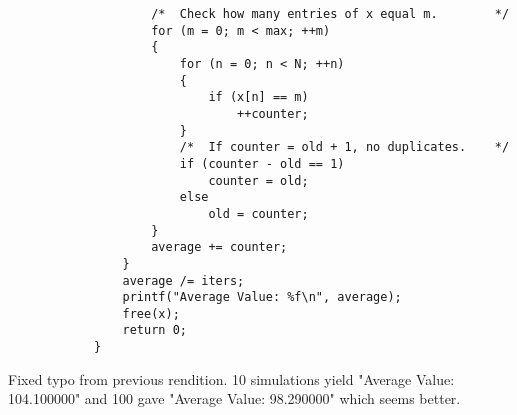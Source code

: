 \documentclass{article}
\begin{document}
\begin{lstlisting}
                    /*  Check how many entries of x equal m.        */
                    for (m = 0; m < max; ++m)
                    {
                        for (n = 0; n < N; ++n)
                        {
                            if (x[n] == m)
                                ++counter;
                        }
                        /*  If counter = old + 1, no duplicates.    */
                        if (counter - old == 1)
                            counter = old;
                        else
                            old = counter;
                    }
                    average += counter;
                }
                average /= iters;
                printf("Average Value: %f\n", average);
                free(x);
                return 0;
            }
        \end{lstlisting}
        Fixed typo from previous rendition. 10 simulations yield "Average Value: 104.100000"
        and 100 gave "Average Value: 98.290000" which seems better.
\end{document}
